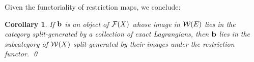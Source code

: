 \documentclass{article}
\theoremstyle{plain}%
\newtheorem{cor}[thm]{Corollary}
\theoremstyle{definition}
\numberwithin{equation}{section}
\numberwithin{figure}{section}
\def\cF{{\mathbin{\cal F}}}
\def\cL{{\mathbin{\cal L}}}
\def\cR{{\mathbin{\cal R}}}
\def\cW{{\mathbin{\cal W}}}
\def\ex{{   {\rm ex}    }}\def\virt{{   {\rm virt}    }}\def\ev{{\rm ev}}\def\sing{{\rm sing}}\def\cont{{\rm cont}}
\begin{document}
  
Given the functoriality of restriction maps, we conclude:
  \begin{cor} \label{cor:generation_preserved_by_restriction}
    If ${\mathbf{b}}$ is an object of $\cF(X)$ whose image in $\cW(E)$ lies in the category split-generated by a collection of exact Lagrangians, then ${\mathbf{b}}$ lies in the subcategory of $\cW(X)$ split-generated by their images under the restriction functor. \qed
  \end{cor}
\end{document}
